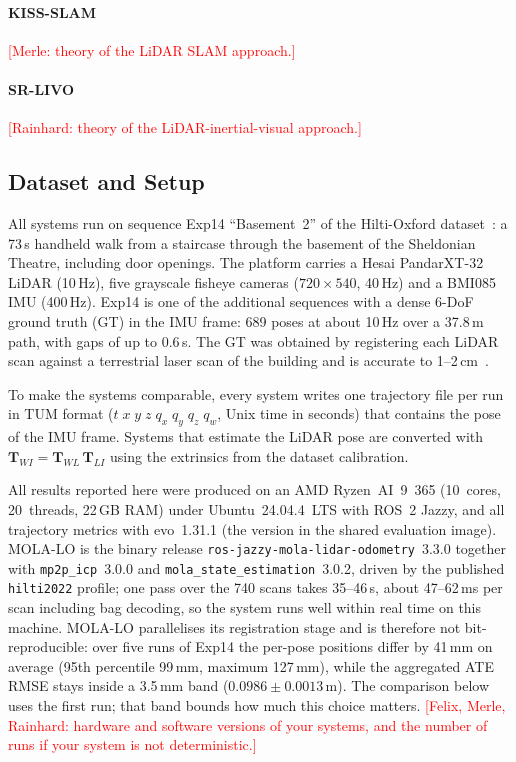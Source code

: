 \documentclass[conference]{IEEEtran}
\newcommand{\todo}[1]{\textcolor{red}{[#1]}}
\begin{document}
\paragraph*{KISS-SLAM} \todo{Merle: theory of the LiDAR SLAM approach.}

\paragraph*{SR-LIVO} \todo{Rainhard: theory of the LiDAR-inertial-visual approach.}

\subsection{Dataset and Setup}
\label{sec:setup}
All systems run on sequence Exp14 ``Basement~2'' of the Hilti-Oxford dataset~\cite{zhang2023hilti}:
a 73\,s handheld walk from a staircase through the basement of the Sheldonian Theatre,
including door openings. The platform carries a Hesai PandarXT-32 LiDAR (10\,Hz), five grayscale
fisheye cameras ($720\times540$, 40\,Hz) and a BMI085 IMU (400\,Hz). Exp14 is one of the
additional sequences with a dense 6-DoF ground truth (GT) in the IMU frame: 689 poses at about
10\,Hz over a 37.8\,m path, with gaps of up to 0.6\,s. The GT was obtained by registering each
LiDAR scan against a terrestrial laser scan of the building and is accurate to 1--2\,cm~\cite{zhang2023hilti}.

To make the systems comparable, every system writes one trajectory file per run in TUM format
($t\;x\;y\;z\;q_x\;q_y\;q_z\;q_w$, Unix time in seconds) that contains the pose of the IMU frame.
Systems that estimate the LiDAR pose are converted with $\mathbf{T}_{WI}=\mathbf{T}_{WL}\,\mathbf{T}_{LI}$
using the extrinsics from the dataset calibration.

All results reported here were produced on an AMD Ryzen~AI~9~365 (10~cores, 20~threads,
22\,GB RAM) under Ubuntu~24.04.4~LTS with ROS~2 Jazzy, and all trajectory metrics with
evo~1.31.1 (the version in the shared evaluation image). MOLA-LO is the binary release \texttt{ros-jazzy-mola-lidar-odometry}~3.3.0
together with \texttt{mp2p\_icp}~3.0.0 and \texttt{mola\_state\_estimation}~3.0.2, driven by
the published \texttt{hilti2022} profile; one pass over the 740 scans takes 35--46\,s, about
47--62\,ms per scan including bag decoding, so the system runs well within real time on this
machine. MOLA-LO parallelises its registration stage and is therefore not bit-reproducible:
over five runs of Exp14 the per-pose positions differ by 41\,mm on average (95th percentile
99\,mm, maximum 127\,mm), while the aggregated ATE RMSE stays inside a 3.5\,mm band
($0.0986\pm0.0013$\,m). The comparison below uses the first run; that band bounds how much
this choice matters. \todo{Felix, Merle, Rainhard: hardware and software versions of your
systems, and the number of runs if your system is not deterministic.}
\end{document}
